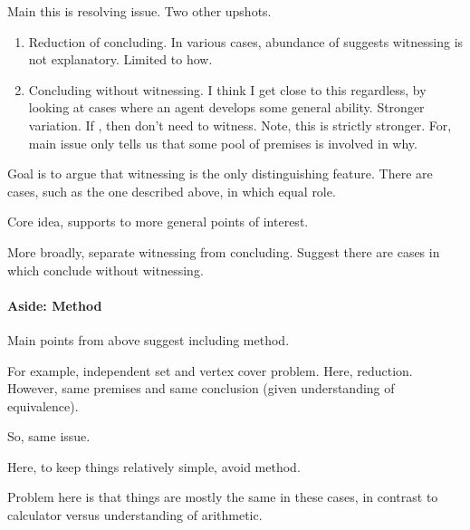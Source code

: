 \begin{note}
  Main this is resolving issue.
  Two other upshots.

  \begin{enumerate}
  \item
    Reduction of concluding.
    In various cases, abundance of  suggests witnessing is not explanatory.
    Limited to how.
  \item
    Concluding without witnessing.
    {
      \color{red}
      I think I get close to this regardless, by looking at cases where an agent develops some general ability.
    }
    Stronger variation.
    If , then don't need to witness.
    Note, this is strictly stronger.
    For, main issue only tells us that some pool of premises is involved in why.
  \end{enumerate}
\end{note}

{
  Goal is to argue that witnessing is the only distinguishing feature.
  There are cases, such as the one described above, in which equal role.

  Core idea, supports to more general points of interest.

  More broadly, separate witnessing from concluding.
  Suggest there are cases in which conclude without witnessing.
}

\paragraph*{Aside: Method}

\begin{note}
  Main points from above suggest including method.

  For example, independent set and vertex cover problem.
  Here, reduction.
  However, same premises and same conclusion (given understanding of equivalence).

  So, same issue.

  Here, to keep things relatively simple, avoid method.

  Problem here is that things are mostly the same in these cases, in contrast to calculator versus understanding of arithmetic.
\end{note}


